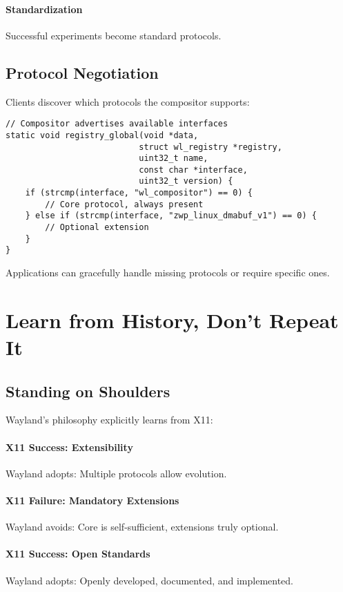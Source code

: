 \paragraph{Standardization}
Successful experiments become standard protocols.

\subsection{Protocol Negotiation}

Clients discover which protocols the compositor supports:
\begin{lstlisting}[style=cstyle]
// Compositor advertises available interfaces
static void registry_global(void *data,
                           struct wl_registry *registry,
                           uint32_t name,
                           const char *interface,
                           uint32_t version) {
    if (strcmp(interface, "wl_compositor") == 0) {
        // Core protocol, always present
    } else if (strcmp(interface, "zwp_linux_dmabuf_v1") == 0) {
        // Optional extension
    }
}
\end{lstlisting}

Applications can gracefully handle missing protocols or require specific ones.

\section{Learn from History, Don't Repeat It}

\subsection{Standing on Shoulders}

Wayland's philosophy explicitly learns from X11:

\paragraph{X11 Success: Extensibility}
Wayland adopts: Multiple protocols allow evolution.

\paragraph{X11 Failure: Mandatory Extensions}
Wayland avoids: Core is self-sufficient, extensions truly optional.

\paragraph{X11 Success: Open Standards}
Wayland adopts: Openly developed, documented, and implemented.

